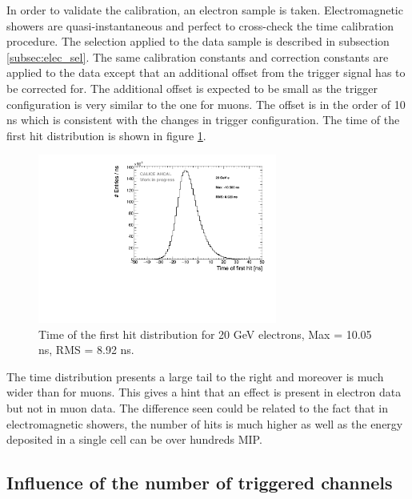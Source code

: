 \documentclass[twoside,a4paper,11pt]{article}
\begin{document}
In order to validate the calibration, an electron sample is taken. Electromagnetic showers are quasi-instantaneous and perfect to cross-check the time calibration procedure. The selection applied to the data sample is described in subsection \ref{subsec:elec_sel}. The same calibration constants and correction constants are applied to the data except that an additional offset from the trigger signal has to be corrected for. The additional offset is expected to be small as the trigger configuration is very similar to the one for muons. The offset is in the order of 10 ns which is consistent with the changes in trigger configuration. The time of the first hit distribution is shown in figure \ref{fig:Timing_electrons}.
\begin{figure}[htbp]
\begin{center}
\includegraphics[width=0.7\textwidth]{fig/Electrons/Timing_AllLayers_AfterMuons.pdf}
\caption{Time of the first hit distribution for 20 GeV electrons, Max = 10.05 ns, RMS = 8.92 ns.}
\label{fig:Timing_electrons}
\end{center}
\end{figure}
The time distribution presents a large tail to the right and moreover is much wider than for muons. This gives a hint that an effect is present in electron data but not in muon data. The difference seen could be related to the fact that in electromagnetic showers, the number of hits is much higher as well as the energy deposited in a single cell can be over hundreds MIP.

\subsection{Influence of the number of triggered channels}
\label{subsec:ped_shift}
\end{document}

